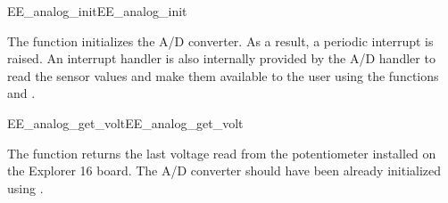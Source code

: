 \begin{function_nopb2}{EE\_analog\_init}{EE_analog_init}
  
  \begin{fundescription}
    The function initializes the A/D converter. As a result, a
    periodic interrupt is raised. An interrupt handler is also
    internally provided by the A/D handler to read the sensor values
    and make them available to the user using the functions
     and .
  \end{fundescription}
  
  
  
\end{function_nopb2}


\begin{function_nopb2}{EE\_analog\_get\_volt}{EE_analog_get_volt}
  
  \begin{fundescription}
    The function returns the last voltage read from the potentiometer
    installed on the Explorer 16 board. The A/D converter should have
    been already initialized using .
  \end{fundescription}
  
  
  \begin{funreturn}
  \end{funreturn}
  
\end{function_nopb2}

